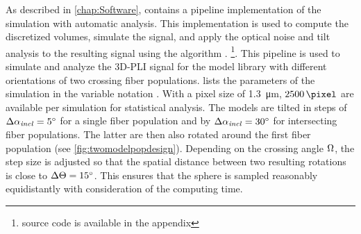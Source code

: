 % 
% 
%
As described in \cref{chap:Software}, \fastpli{} contains a pipeline implementation of the simulation with automatic analysis.
This implementation is used to compute the discretized volumes, simulate the signal, and apply the optical noise and tilt analysis to the resulting signal using the algorithm \rofl{}. \footnote{source code is available in the appendix \dummy{}}.
This pipeline is used to simulate and analyze the \ac{3D-PLI} signal for the model library with different orientations of two crossing fiber populations.
 lists the parameters of the simulation in the variable notation \fastpli{}.
With a pixel size of \SI{1.3}{\micro\meter}, $\SI{2500}{\pixel}$ are available per simulation for statistical analysis.
The models are tilted in steps of $\Delta \textnormal{$\alpha_{\mathit{incl}}$} = \SI{5}{\degree}$ for a single fiber population and by $\Delta \textnormal{$\alpha_{\mathit{incl}}$} = \SI{30}{\degree}$ for intersecting fiber populations. The latter are then also rotated around the first fiber population (see \cref{fig:twomodelpopdesign}).
Depending on the crossing angle $\textnormal{$\Omega$}$, the step size is adjusted so that the spatial distance between two resulting rotations is close to $\Delta \textnormal{$\Theta$} = \SI{15}{\degree}$.
This ensures that the sphere is sampled reasonably equidistantly with consideration of the computing time.
% 
% 
% 
